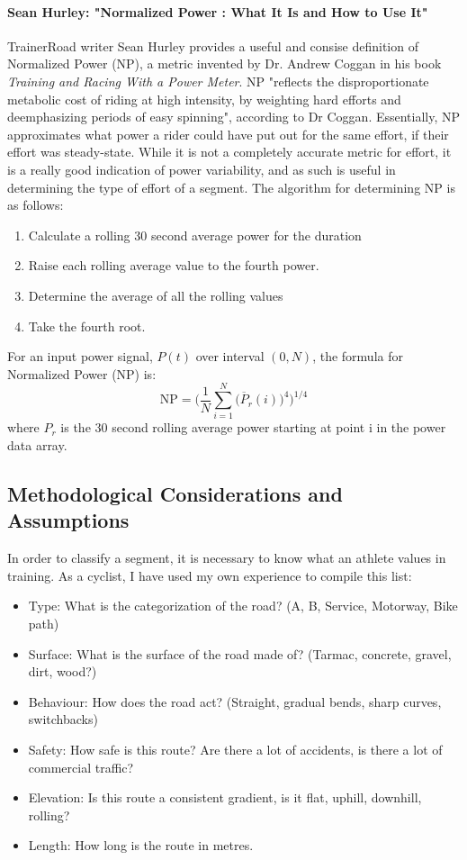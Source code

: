 \documentclass[11pt,twoside]{report}
\begin{document}
\paragraph{Sean Hurley: "Normalized Power \citep{Hurley2020}: What It Is and How to Use It"}
TrainerRoad writer Sean Hurley provides a useful and consise definition of Normalized Power (NP), a metric invented by Dr. Andrew Coggan in his book \textit{Training and Racing With a Power Meter}. NP
"reflects the disproportionate metabolic cost of riding at high intensity, by weighting hard efforts and deemphasizing periods of easy spinning", according to Dr Coggan.
Essentially, NP approximates what power a rider could have put out for the same effort, if their effort was steady-state. While it is not a completely accurate metric for effort, it is a really
good indication of power variability, and as such is useful in determining the type of effort of a segment. The algorithm for determining NP is as follows:
\begin{enumerate}
	\item Calculate a rolling 30 second average power for the duration
	\item Raise each rolling average value to the fourth power.
	\item Determine the average of all the rolling values
	\item Take the fourth root.
\end{enumerate}
For an input power signal, $P(t)$ over interval $(0,N)$, the formula for Normalized Power (NP) is:
\[
	\mathrm{NP} = \bigg( \frac{1}{N} \sum_{i=1}^{N}\big(\overline{P}_{r}(i)\big)^{4}\bigg)^{1/4}
\]
where $P_r$ is the 30 second rolling average power starting at point i in the power data array.
\subsection{Methodological Considerations and Assumptions}
In order to classify a segment, it is necessary to know what an athlete values in training. As a cyclist, I have used my own experience to compile this list:

\begin{itemize}
	\item Type: What is the categorization of the road? (A, B, Service, Motorway, Bike path)
	\item Surface: What is the surface of the road made of? (Tarmac, concrete, gravel, dirt, wood?)
	\item Behaviour: How does the road act? (Straight, gradual bends, sharp curves, switchbacks)
	\item Safety: How safe is this route? Are there a lot of accidents, is there a lot of commercial traffic?
	\item Elevation: Is this route a consistent gradient, is it flat, uphill, downhill, rolling?
	\item Length: How long is the route in metres.
\end{itemize}
\end{document}
